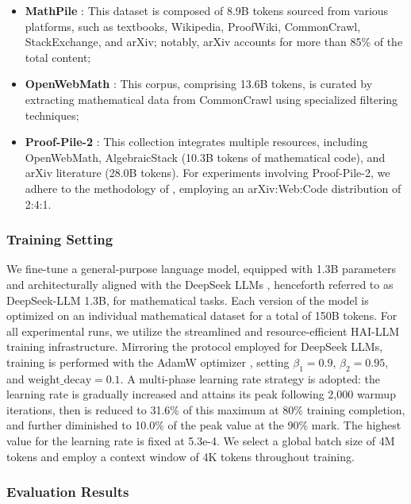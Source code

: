 \begin{itemize}[topsep=0pt]
\begin{itemize}[topsep=0pt]
    \item \textbf{MathPile} \citep{mathpile}: This dataset is composed of 8.9B tokens sourced from various platforms, such as textbooks, Wikipedia, ProofWiki, CommonCrawl, StackExchange, and arXiv; notably, arXiv accounts for more than 85\% of the total content;
    \item \textbf{OpenWebMath} \citep{openwebmath}: This corpus, comprising 13.6B tokens, is curated by extracting mathematical data from CommonCrawl using specialized filtering techniques;
    \item \textbf{Proof-Pile-2} \citep{llemma}: This collection integrates multiple resources, including OpenWebMath, AlgebraicStack (10.3B tokens of mathematical code), and arXiv literature (28.0B tokens). For experiments involving Proof-Pile-2, we adhere to the methodology of \cite{llemma}, employing an arXiv:Web:Code distribution of 2:4:1.
\end{itemize}

\subsubsection{Training Setting}
\label{sec:quality-policy}
We fine-tune a general-purpose language model, equipped with 1.3B parameters and architecturally aligned with the DeepSeek LLMs \citep{deepseek-llm}, henceforth referred to as DeepSeek-LLM 1.3B, for mathematical tasks. Each version of the model is optimized on an individual mathematical dataset for a total of 150B tokens. For all experimental runs, we utilize the streamlined and resource-efficient HAI-LLM \citep{haillm} training infrastructure. Mirroring the protocol employed for DeepSeek LLMs, training is performed with the AdamW optimizer \citep{adamW}, setting $\beta_1=0.9$, $\beta_2=0.95$, and $\mathrm{weight\_decay}=0.1$. A multi-phase learning rate strategy is adopted: the learning rate is gradually increased and attains its peak following 2,000 warmup iterations, then is reduced to 31.6\% of this maximum at 80\% training completion, and further diminished to 10.0\% of the peak value at the 90\% mark. The highest value for the learning rate is fixed at 5.3e-4. We select a global batch size of 4M tokens and employ a context window of 4K tokens throughout training.

\subsubsection{Evaluation Results}


\end{itemize}
